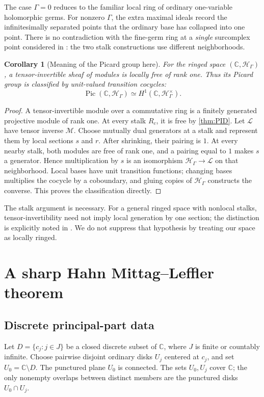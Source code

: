 \documentclass[11pt,letterpaper]{article}
\newtheorem{corollary}[corollary]{Corollary}
\theoremstyle{definition}
\theoremstyle{remark}
\newcommand{\C}{\mathbb C}
\newcommand{\HH}{\mathscr H_\Gamma}
\newcommand{\Pic}{\operatorname{Pic}}
\numberwithin{equation}{section}
\begin{document}
The case $\Gamma=0$ reduces to the familiar local ring of ordinary one-variable holomorphic germs. For nonzero $\Gamma$, the extra maximal ideals record the infinitesimally separated points that the ordinary base has collapsed into one point. There is no contradiction with the fine-germ ring at a \emph{single} surcomplex point considered in \cite{Source}: the two stalk constructions use different neighborhoods.

\begin{corollary}[Meaning of the Picard group here]\label{cor:Picmeaning}
For the ringed space $(\C,\HH)$, a tensor-invertible sheaf of modules is locally free of rank one. Thus its Picard group is classified by unit-valued transition cocycles:
\[
 \Pic(\C,\HH)\simeq H^1(\C,\HH^\times).
\]
\end{corollary}
\begin{proof}
A tensor-invertible module over a commutative ring is a finitely generated projective module of rank one. At every stalk $R_c$, it is free by \cref{thm:PID}. Let $\mathcal L$ have tensor inverse $\mathcal M$. Choose mutually dual generators at a stalk and represent them by local sections $s$ and $r$. After shrinking, their pairing is $1$. At every nearby stalk, both modules are free of rank one, and a pairing equal to $1$ makes $s$ a generator. Hence multiplication by $s$ is an isomorphism $\HH\to\mathcal L$ on that neighborhood. Local bases have unit transition functions; changing bases multiplies the cocycle by a coboundary, and gluing copies of $\HH$ constructs the converse. This proves the classification directly.
\end{proof}
The stalk argument is necessary. For a general ringed space with nonlocal stalks, tensor-invertibility need not imply local generation by one section; the distinction is explicitly noted in \cite[Tag 09NT]{Stacks}. We do not suppress that hypothesis by treating our space as locally ringed.

\section{A sharp Hahn Mittag--Leffler theorem}\label{sec:ML}
\subsection{Discrete principal-part data}
Let $D=\{c_j:j\in J\}$ be a closed discrete subset of $\C$, where $J$ is finite or countably infinite. Choose pairwise disjoint ordinary disks $U_j$ centered at $c_j$, and set $U_0=\C\setminus D$. The punctured plane $U_0$ is connected. The sets $U_0,U_j$ cover $\C$; the only nonempty overlaps between distinct members are the punctured disks $U_0\cap U_j$.
\end{document}
